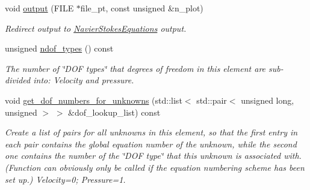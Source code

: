 \begin{DoxyCompactItemize}
void \hyperlink{classoomph_1_1GeneralisedNewtonianAxisymmetricQCrouzeixRaviartElement_ad5949f8a416c48a56e82a154d9a9bfbe}{output} (F\+I\+LE $\ast$file\+\_\+pt, const unsigned \&n\+\_\+plot)
\begin{DoxyCompactList}\small\item\em Redirect output to \hyperlink{classoomph_1_1NavierStokesEquations}{Navier\+Stokes\+Equations} output. \end{DoxyCompactList}\item 
unsigned \hyperlink{classoomph_1_1GeneralisedNewtonianAxisymmetricQCrouzeixRaviartElement_adabb660209259f2ac02d996e8401fc34}{ndof\+\_\+types} () const
\begin{DoxyCompactList}\small\item\em The number of \char`\"{}\+D\+O\+F types\char`\"{} that degrees of freedom in this element are sub-\/divided into\+: Velocity and pressure. \end{DoxyCompactList}\item 
void \hyperlink{classoomph_1_1GeneralisedNewtonianAxisymmetricQCrouzeixRaviartElement_a986a8326bbeda5ad9dd1f69c5d2b9e07}{get\+\_\+dof\+\_\+numbers\+\_\+for\+\_\+unknowns} (std\+::list$<$ std\+::pair$<$ unsigned long, unsigned $>$ $>$ \&dof\+\_\+lookup\+\_\+list) const
\begin{DoxyCompactList}\small\item\em Create a list of pairs for all unknowns in this element, so that the first entry in each pair contains the global equation number of the unknown, while the second one contains the number of the \char`\"{}\+D\+O\+F type\char`\"{} that this unknown is associated with. (Function can obviously only be called if the equation numbering scheme has been set up.) Velocity=0; Pressure=1. \end{DoxyCompactList}\end{DoxyCompactItemize}

